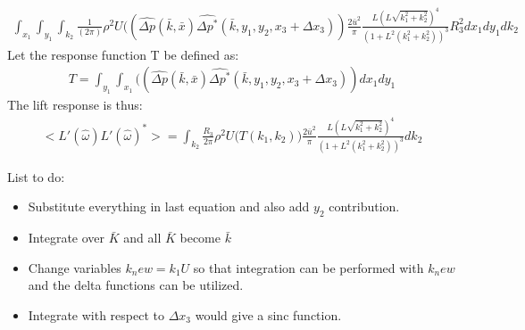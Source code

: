 \documentclass{article}
\begin{document}
\begin{itemize}
\begin{align*}
\int_{x_1} \int_{y_1} \int_{k_2}  \frac{1}{(2\pi)}\rho^2 U ( (\hat{\Delta p}(\bar{k},\bar{x})\hat{\Delta p^*}(\bar{k},y_1,y_2,x_3+\Delta x_3)) \frac{2\bar{u}^2}{\pi}\frac{L(L\sqrt{k_1^2+k_2^2})^4}{(1+L^2(k_1^2+k_2^2))^3}R_3^2 dx_1 dy_1dk_2
\end{align*}
Let the response function T be defined as:
\begin{align*}
T = \int_{y_1} \int_{x_1}( (\hat{\Delta p}(\bar{k},\bar{x})\hat{\Delta p^*}(\bar{k},y_1,y_2,x_3+\Delta x_3))  dx_1 dy_1
\end{align*}
The lift response is thus:
\begin{align*}
\Big<L'(\hat{\omega})L'(\hat{\omega})^*\Big>= \int_{k_2} \frac{R_3}{2\pi} \rho^2 U \Big(T(k_1,k_2)\Big) \frac{2\bar{u}^2}{\pi}\frac{L(L\sqrt{k_1^2+k_2^2})^4}{(1+L^2(k_1^2+k_2^2))^3} dk_2
\end{align*}
\end{itemize}
\newpage
List to do:
\begin{itemize}
\item Substitute everything in last equation and also add $y_2$ contribution. 
\item Integrate over $\bar{K}$ and all $\bar{K}$ become $\bar{k}$
\item Change variables $k_new = k_1 U$ so that integration can be performed with $k_new$ and the delta functions can be utilized. 
\item Integrate with respect to $\Delta x_3$ would give a sinc function. 
\end{itemize}
\end{document}

